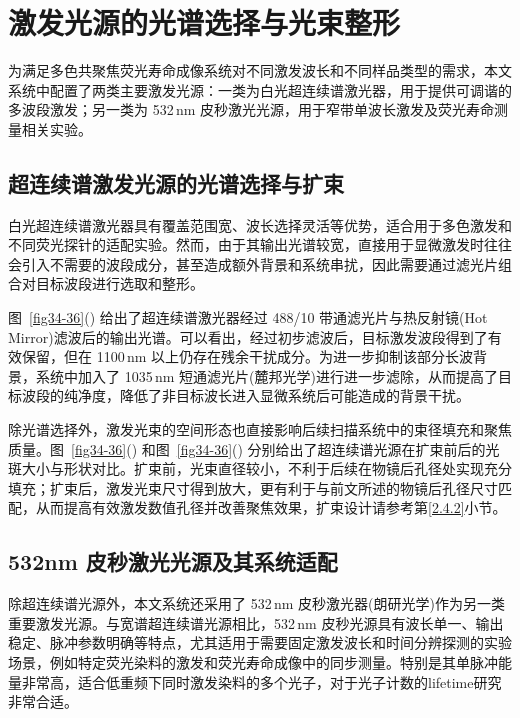 \section{激发光源的光谱选择与光束整形}\label{3.2}

为满足多色共聚焦荧光寿命成像系统对不同激发波长和不同样品类型的需求，本文系统中配置了两类主要激发光源：一类为白光超连续谱激光器，用于提供可调谐的多波段激发；另一类为 532\,nm 皮秒激光光源，用于窄带单波长激发及荧光寿命测量相关实验。

\subsection{超连续谱激发光源的光谱选择与扩束}\label{3.2.1}

白光超连续谱激光器具有覆盖范围宽、波长选择灵活等优势，适合用于多色激发和不同荧光探针的适配实验。然而，由于其输出光谱较宽，直接用于显微激发时往往会引入不需要的波段成分，甚至造成额外背景和系统串扰，因此需要通过滤光片组合对目标波段进行选取和整形。


图~\ref{fig34-36}() 给出了超连续谱激光器经过 488/10 带通滤光片与热反射镜(Hot Mirror)滤波后的输出光谱。可以看出，经过初步滤波后，目标激发波段得到了有效保留，但在 1100\,nm 以上仍存在残余干扰成分。为进一步抑制该部分长波背景，系统中加入了 1035\,nm 短通滤光片(麓邦光学)进行进一步滤除，从而提高了目标波段的纯净度，降低了非目标波长进入显微系统后可能造成的背景干扰。

除光谱选择外，激发光束的空间形态也直接影响后续扫描系统中的束径填充和聚焦质量。图~\ref{fig34-36}() 和图~\ref{fig34-36}() 分别给出了超连续谱光源在扩束前后的光斑大小与形状对比。扩束前，光束直径较小，不利于后续在物镜后孔径处实现充分填充；扩束后，激发光束尺寸得到放大，更有利于与前文所述的物镜后孔径尺寸匹配，从而提高有效激发数值孔径并改善聚焦效果，扩束设计请参考第\ref{2.4.2}小节。




\subsection{532nm 皮秒激光光源及其系统适配}\label{3.2.2}

除超连续谱光源外，本文系统还采用了 532\,nm 皮秒激光器(朗研光学)作为另一类重要激发光源。与宽谱超连续谱光源相比，532\,nm 皮秒光源具有波长单一、输出稳定、脉冲参数明确等特点，尤其适用于需要固定激发波长和时间分辨探测的实验场景，例如特定荧光染料的激发和荧光寿命成像中的同步测量。特别是其单脉冲能量非常高，适合低重频下同时激发染料的多个光子，对于光子计数的lifetime研究非常合适。

